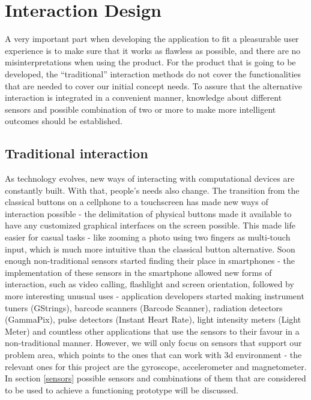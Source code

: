 \section{Interaction Design}
A very important part when developing the application to fit a pleasurable user experience is to make sure that it works as flawless as possible, and there are no misinterpretations when using the product. For the product that is going to be developed, the “traditional” interaction methods do not cover the functionalities that are needed to cover our initial concept needs. To assure that the alternative interaction is integrated in a convenient manner, knowledge about different sensors and possible combination of two or more to make more intelligent outcomes should be established.
\subsection{Traditional interaction}
As technology evolves, new ways of interacting with computational devices are constantly built. With that, people’s needs also change. The transition from the classical buttons on a cellphone to a touchscreen has made new ways of interaction possible - the delimitation of physical buttons made it available to have any customized graphical interfaces on the screen possible. This made life easier for casual tasks - like zooming a photo using two fingers as multi-touch input, which is much more intuitive than the classical button alternative.
Soon enough non-traditional sensors started finding their place in smartphones - the implementation of these sensors in the smartphone allowed new forms of interaction, such as video calling, flashlight and screen orientation, followed by more interesting unusual uses - application developers started making instrument tuners (GStrings), barcode scanners (Barcode Scanner), radiation detectors (GammaPix), pulse detectors (Instant Heart Rate), light intensity meters (Light Meter) and countless other applications that use the sensors to their favour in a non-traditional manner. However, we will only focus on sensors that support our problem area, which points to the ones that can work with 3d environment - the relevant ones for this project are the gyroscope, accelerometer and magnetometer. In section \ref{sensors} possible sensors and combinations of them that are considered to be used to achieve a functioning prototype will be discussed. %

